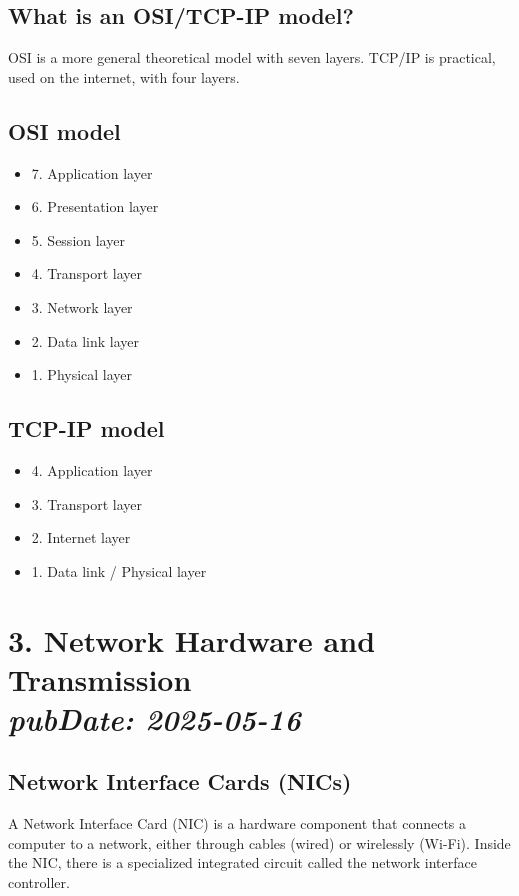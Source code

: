 \documentclass[11pt]{article}
\begin{document}
\subsection*{What is an OSI/TCP-IP model?}
OSI is a more general theoretical model with seven layers. TCP/IP is practical, used on the internet, with four layers.

\subsection*{OSI model}
\begin{itemize}
    \item 7. Application layer
    \item 6. Presentation layer
    \item 5. Session layer
    \item 4. Transport layer
    \item 3. Network layer
    \item 2. Data link layer
    \item 1. Physical layer
\end{itemize}

\subsection*{TCP-IP model}
\begin{itemize}
    \item 4. Application layer
    \item 3. Transport layer
    \item 2. Internet layer
    \item 1. Data link / Physical layer
\end{itemize}

\newpage
\section*{3. Network Hardware and Transmission \\ \normalsize{\textit{pubDate: 2025-05-16}}}

\subsection*{Network Interface Cards (NICs)}
A Network Interface Card (NIC) is a hardware component that connects a computer to a network, either through cables (wired) or wirelessly (Wi-Fi).  
Inside the NIC, there is a specialized integrated circuit called the network interface controller.
\end{document}
